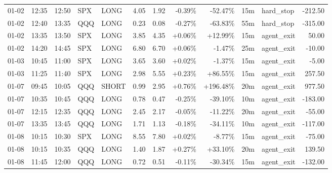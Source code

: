 \documentclass[11pt,a4paper]{article}
\begin{document}
\begin{center}
\begin{longtable}{>{\color{txtmain}}l l l l l r r r r r >{\color{txtmain}}l r}
01-02 & 12:35 & 12:50 & SPX & LONG & 4.05 & 1.92 & \textcolor{lossred}{-0.39\%} & \textcolor{lossred}{-52.47\%} & 15m & hard\_stop & \textcolor{lossred}{-212.50} \\
01-02 & 12:40 & 13:35 & QQQ & LONG & 0.23 & 0.08 & \textcolor{lossred}{-0.27\%} & \textcolor{lossred}{-63.83\%} & 55m & hard\_stop & \textcolor{lossred}{-315.00} \\
01-02 & 13:35 & 13:50 & SPX & LONG & 3.85 & 4.35 & \textcolor{wingreen}{+0.06\%} & \textcolor{wingreen}{+12.99\%} & 15m & agent\_exit & \textcolor{wingreen}{50.00} \\
01-02 & 14:20 & 14:45 & SPX & LONG & 6.80 & 6.70 & \textcolor{wingreen}{+0.06\%} & \textcolor{lossred}{-1.47\%} & 25m & agent\_exit & \textcolor{lossred}{-10.00} \\
01-03 & 10:45 & 11:00 & SPX & LONG & 3.65 & 3.60 & \textcolor{wingreen}{+0.02\%} & \textcolor{lossred}{-1.37\%} & 15m & agent\_exit & \textcolor{lossred}{-5.00} \\
01-03 & 11:25 & 11:40 & SPX & LONG & 2.98 & 5.55 & \textcolor{wingreen}{+0.23\%} & \textcolor{wingreen}{+86.55\%} & 15m & agent\_exit & \textcolor{wingreen}{257.50} \\
01-07 & 09:45 & 10:05 & QQQ & SHORT & 0.99 & 2.95 & \textcolor{wingreen}{+0.76\%} & \textcolor{wingreen}{+196.48\%} & 20m & agent\_exit & \textcolor{wingreen}{977.50} \\
01-07 & 10:35 & 10:45 & QQQ & LONG & 0.78 & 0.47 & \textcolor{lossred}{-0.25\%} & \textcolor{lossred}{-39.10\%} & 10m & agent\_exit & \textcolor{lossred}{-183.00} \\
01-07 & 12:15 & 12:35 & QQQ & LONG & 2.45 & 2.17 & \textcolor{lossred}{-0.05\%} & \textcolor{lossred}{-11.22\%} & 20m & agent\_exit & \textcolor{lossred}{-55.00} \\
01-07 & 13:35 & 13:45 & QQQ & LONG & 1.71 & 1.13 & \textcolor{lossred}{-0.18\%} & \textcolor{lossred}{-34.11\%} & 10m & agent\_exit & \textcolor{lossred}{-117.00} \\
01-08 & 10:15 & 10:30 & SPX & LONG & 8.55 & 7.80 & \textcolor{wingreen}{+0.02\%} & \textcolor{lossred}{-8.77\%} & 15m & agent\_exit & \textcolor{lossred}{-75.00} \\
01-08 & 10:15 & 10:35 & QQQ & LONG & 1.40 & 1.87 & \textcolor{wingreen}{+0.27\%} & \textcolor{wingreen}{+33.10\%} & 20m & agent\_exit & \textcolor{wingreen}{139.50} \\
01-08 & 11:45 & 12:00 & QQQ & LONG & 0.72 & 0.51 & \textcolor{lossred}{-0.11\%} & \textcolor{lossred}{-30.34\%} & 15m & agent\_exit & \textcolor{lossred}{-132.00} \\

\end{longtable}
\end{center}
\end{document}
